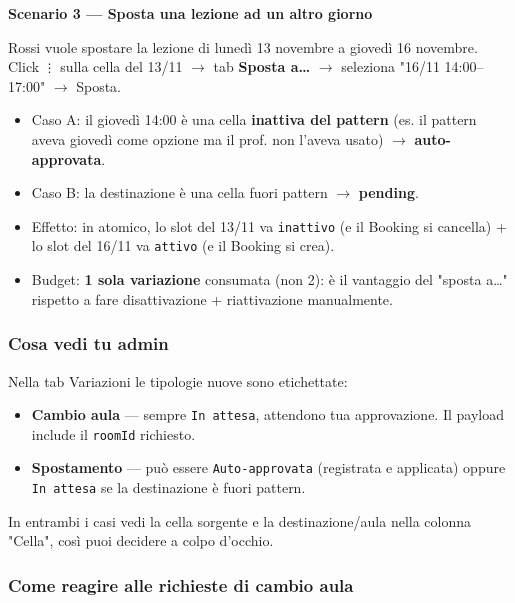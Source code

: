 \documentclass[11pt,a4paper]{article}
\begin{document}
\textbf{Scenario 3 --- Sposta una lezione ad un altro giorno}

Rossi vuole spostare la lezione di lunedì 13 novembre a giovedì 16 novembre. Click \texttt{⋮} sulla cella del 13/11 $\rightarrow$ tab \textbf{Sposta a\ldots{}} $\rightarrow$ seleziona "16/11 14:00--17:00" $\rightarrow$ Sposta.

\begin{itemize}
  \item Caso A: il giovedì 14:00 è una cella \textbf{inattiva del pattern} (es. il pattern aveva giovedì come opzione ma il prof. non l'aveva usato) $\rightarrow$ \textbf{auto-approvata}.
  \item Caso B: la destinazione è una cella fuori pattern $\rightarrow$ \textbf{pending}.
  \item Effetto: in atomico, lo slot del 13/11 va \texttt{inattivo} (e il Booking si cancella) + lo slot del 16/11 va \texttt{attivo} (e il Booking si crea).
  \item Budget: \textbf{1 sola variazione} consumata (non 2): è il vantaggio del "sposta a\ldots{}" rispetto a fare disattivazione + riattivazione manualmente.
\end{itemize}

\subsubsection{Cosa vedi tu admin}


Nella tab Variazioni le tipologie nuove sono etichettate:

\begin{itemize}
  \item \textbf{Cambio aula} --- sempre \texttt{In attesa}, attendono tua approvazione. Il payload include il \texttt{roomId} richiesto.
  \item \textbf{Spostamento} --- può essere \texttt{Auto-approvata} (registrata e applicata) oppure \texttt{In attesa} se la destinazione è fuori pattern.
\end{itemize}

In entrambi i casi vedi la cella sorgente e la destinazione/aula nella colonna "Cella", così puoi decidere a colpo d'occhio.

\subsubsection{Come reagire alle richieste di cambio aula}
\end{document}
